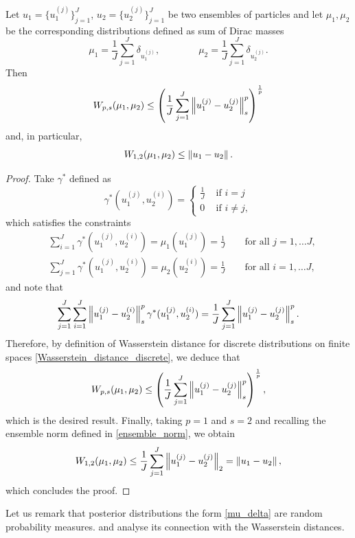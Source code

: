 \documentclass[10pt]{article}
\begin{document}
\begin{lemma}
\label{Wasserstein_ensemble_norm}
Let $u_1 = \{ u_1^{(j)} \}_{j=1}^J$, $u_2 = \{ u_2^{(j)} \}_{j=1}^J$ be two ensembles of particles and let $\mu_1, \mu_2$ be the corresponding distributions defined as sum of Dirac masses
\begin{equation*}
\mu_1 = \frac{1}{J} \sum_{j=1}^J \delta_{u_1^{(j)}}, \qquad \qquad \mu_2 = \frac{1}{J} \sum_{j=1}^J \delta_{u_2^{(j)}}.
\end{equation*}
Then
\[ W_{p,s}(\mu_1, \mu_2) \le \left ( \frac{1}{J} \sum_{j=1}^J \left\|u_1^{(j)} - u_2^{(j)}\right\|_s^p \right )^{\frac{1}{p}} \]
and, in particular,
\[ W_{1,2}(\mu_1, \mu_2) \le \left\|u_1 - u_2\right\|. \]
\end{lemma}
\begin{proof}
Take $\gamma^*$ defined as
\begin{equation*}
\gamma^*(u_1^{(j)}, u_2^{(i)}) = 
\begin{cases}
\frac{1}{J} & \text{ if } i = j \\
0 & \text{ if } i \neq j,
\end{cases}
\end{equation*}
which satisfies the constraints
\begin{align*}
& \sum_{i=1}^{J} \gamma^*(u_1^{(j)}, u_2^{(i)}) = \mu_1(u_1^{(j)}) = \frac{1}{J} \qquad \text{for all } j = 1, \dots J, \\
& \sum_{j=1}^{J} \gamma^*(u_1^{(j)}, u_2^{(i)}) = \mu_2(u_2^{(i)}) = \frac{1}{J} \qquad \text{for all } i = 1, \dots J,
\end{align*}
and note that
\begin{equation*}
\sum_{j=1}^{J} \sum_{i=1}^{J} \left\|u_1^{(j)} - u_2^{(i)}\right\|_s^p \gamma^*(u_1^{(j)}, u_2^{(i)}) = \frac{1}{J} \sum_{j=1}^{J} \left\|u_1^{(j)} - u_2^{(j)}\right\|_s^p.
\end{equation*}
Therefore, by definition of Wasserstein distance for discrete distributions on finite spaces \eqref{Wasserstein_distance_discrete}, we deduce that
\[ W_{p,s}(\mu_1, \mu_2) \le \left ( \frac{1}{J} \sum_{j=1}^J \left\|u_1^{(j)} - u_2^{(j)}\right\|_s^p \right )^{\frac{1}{p}}, \]
which is the desired result. Finally, taking $p = 1$ and $s = 2$ and recalling the ensemble norm defined in \eqref{ensemble_norm}, we obtain
\[ W_{1,2}(\mu_1, \mu_2) \le \frac{1}{J} \sum_{j=1}^J \left\|u_1^{(j)} - u_2^{(j)}\right\|_2 = \left\|u_1 - u_2\right\|, \]
which concludes the proof.
\end{proof}

Let us remark that posterior distributions  the form \eqref{mu_delta} are random probability measures.  and analyse its connection with the Wasserstein distances.
\end{document}

